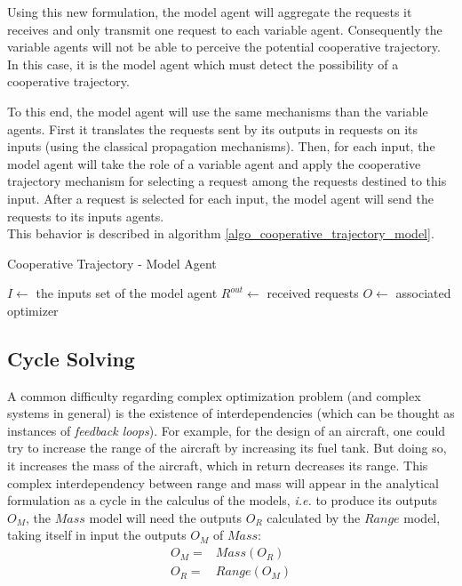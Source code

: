 Using this new formulation, the model agent will aggregate the requests it receives and only transmit one request to each variable agent. Consequently the variable agents will not be able to perceive the potential cooperative trajectory. In this case, it is the model agent which must detect the possibility of a cooperative trajectory.

To this end, the model agent will use the same mechanisms than the variable agents. First it translates the requests sent by its outputs in requests on its inputs (using the classical propagation mechanisms). Then, for each input, the model agent will take the role of a variable agent and apply the cooperative trajectory mechanism for selecting a request among the requests destined to this input. After a request is selected for each input, the model agent will send the requests to its inputs agents.\\
This behavior is described in algorithm \ref{algo_cooperative_trajectory_model}.

\begin{algorithm}
\caption{Cooperative Trajectory - Model Agent}
\label{algo_cooperative_trajectory_model}
	$I \leftarrow$ the inputs set of the model agent\;
	$R^{out} \leftarrow$ received requests\;
	$O \leftarrow$ associated optimizer\;
\end{algorithm}

\subsection{Cycle Solving}\label{NCS_cycles}

A common difficulty regarding complex optimization problem (and complex systems in general) is the existence of interdependencies (which can be thought as instances of \emph{feedback loops}). For example, for the design of an aircraft, one could try to increase the range of the aircraft by increasing its fuel tank. But doing so, it increases the mass of the aircraft, which in return decreases its range. This complex interdependency between range and mass will appear in the analytical formulation as a cycle in the calculus of the models, \emph{i.e.} to produce its outputs $O_M$, the $Mass$ model will need the outputs $O_R$ calculated by the $Range$ model, taking itself in input the outputs $O_M$ of $Mass$:
\begin{align*}
O_M = &Mass(O_R)\\
O_R = &Range(O_M)
\end{align*}

